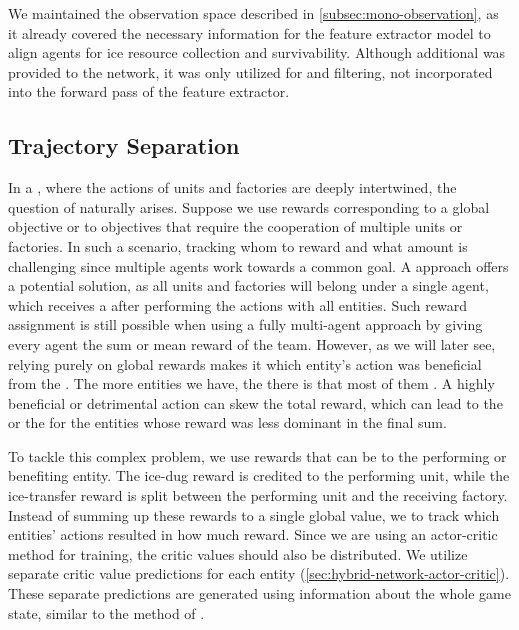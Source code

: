 \noindent We maintained the observation space described in \autoref{subsec:mono-observation}, as it already covered the necessary information for the feature extractor model to align agents for ice resource collection and survivability. Although additional  was provided to the network, it was only utilized for  and filtering, not incorporated into the forward pass of the feature extractor.

\subsection{Trajectory Separation} \label{subsec:grouping}

\noindent In a , where the actions of units and factories are deeply intertwined, the question of  naturally arises. Suppose we use rewards corresponding to a global objective or to objectives that require the cooperation of multiple units or factories. In such a scenario, tracking whom to reward and what amount is challenging since multiple agents work towards a common goal. A  approach offers a potential solution, as all units and factories will belong under a single agent, which receives a  after performing the actions with all entities. Such reward assignment is still possible when using a fully multi-agent approach by giving every agent the sum or mean reward of the team. \label{par:global-rew} However, as we will later see, relying purely on global rewards makes it  which entity's action was beneficial from the . The more entities we have, the  there is that most of them . A highly beneficial or detrimental action can skew the total reward, which can lead to the  or the  for the entities whose reward was less dominant in the final sum.

\bigskip

\noindent To tackle this complex problem, we use rewards that can be  to the performing or benefiting entity. The ice-dug reward is credited to the performing unit, while the ice-transfer reward is split between the performing unit and the receiving factory. Instead of summing up these rewards to a single global value, we  to track which entities' actions resulted in how much reward. Since we are using an actor-critic method for training, the critic values should also be distributed. We utilize separate critic value predictions for each entity (\autoref{sec:hybrid-network-actor-critic}). These separate predictions are generated using information about the whole game state, similar to the method of \cite{lowe2020multiagent}.

